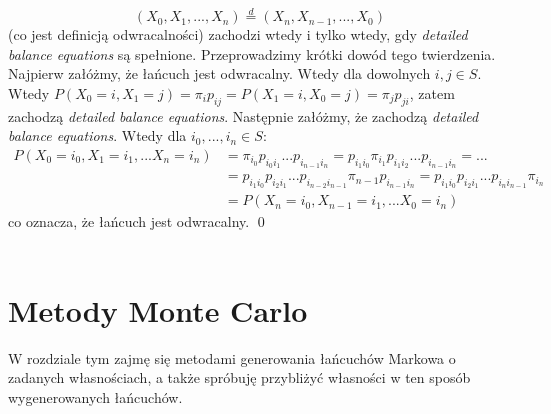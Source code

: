\documentclass[a4paper]{article}
\begin{document}
$$(X_0, X_1, ..., X_n) \overset{d}{=} (X_n, X_{n-1}, ..., X_0)$$
(co jest definicją odwracalności) zachodzi wtedy i tylko wtedy, gdy \textit{detailed balance equations} są spełnione.
Przeprowadzimy krótki dowód tego twierdzenia.
Najpierw załóżmy, że łańcuch jest odwracalny. Wtedy dla dowolnych $i,j \in S$. Wtedy $P(X_0 = i, X_1 = j) = \pi_i p_{ij} = P(X_1 = i, X_0 = j) = \pi_j p_{ji}$, zatem zachodzą \textit{detailed balance equations}. Następnie załóżmy, że zachodzą \textit{detailed balance equations}. Wtedy dla $i_0, ..., i_n \in S$:
\begin{align*}
P(X_0 = i_0, X_1 = i_1, ... X_n = i_n) &= \pi_{i_0} p_{i_0 i_1} ... p_{i_{n-1} i_n} =
p_{i_1 i_0} \pi_{i_1}  p_{i_1 i_2} ... p_{i_{n-1} i_n} = ... \\ &=p_{i_1 i_0} p_{i_2 i_1} ... p_{i_{n-2} i_{n-1}} \pi_{n-1} p_{i_{n-1} i_n} = p_{i_1 i_0} p_{i_2 i_1} ... p_{i_{n} i_{n-1}} \pi_{i_n} \\
&=P(X_n = i_0, X_{n-1} = i_1, ... X_0 = i_n)
\end{align*}
co oznacza, że łańcuch jest odwracalny. \qed
\\\\
\section{Metody Monte Carlo}
W rozdziale tym zajmę się metodami generowania łańcuchów Markowa o zadanych własnościach, a także spróbuję przybliżyć własności w ten sposób wygenerowanych łańcuchów.
\\
\end{document}

